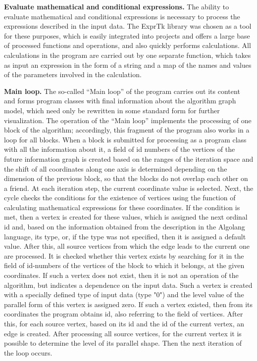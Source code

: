 \textbf{Evaluate mathematical and conditional expressions.} The ability to evaluate mathematical and conditional expressions is necessary to process the expressions described in the input data. The ExprTk library was chosen as a tool for these purposes, which is easily integrated into projects and offers a large base of processed functions and operations, and also quickly performs calculations. All calculations in the program are carried out by one separate function, which takes as input an expression in the form of a string and a map of the names and values of the parameters involved in the calculation.

\textbf{Main loop.} The so-called “Main loop” of the program carries out its content and forms program classes with final information about the algorithm graph model, which need only be rewritten in some standard form for further visualization. The operation of the “Main loop” implements the processing of one block of the algorithm; accordingly, this fragment of the program also works in a loop for all blocks. When a block is submitted for processing as a program class with all the information about it, a field of id numbers of the vertices of the future information graph is created based on the ranges of the iteration space and the shift of all coordinates along one axis is determined depending on the dimension of the previous block, so that the blocks do not overlap each other on a friend. At each iteration step, the current coordinate value is selected. Next, the cycle checks the conditions for the existence of vertices using the function of calculating mathematical expressions for these coordinates. If the condition is met, then a vertex is created for these values, which is assigned the next ordinal id and, based on the information obtained from the description in the Algolang language, its type, or, if the type was not specified, then it is assigned a default value. After this, all source vertices from which the edge leads to the current one are processed. It is checked whether this vertex exists by searching for it in the field of id-numbers of the vertices of the block to which it belongs, at the given coordinates. If such a vertex does not exist, then it is not an operation of the algorithm, but indicates a dependence on the input data. Such a vertex is created with a specially defined type of input data (type "0") and the level value of the parallel form of this vertex is assigned zero. If such a vertex existed, then from its coordinates the program obtains id, also referring to the field of vertices. After this, for each source vertex, based on its id and the id of the current vertex, an edge is created. After processing all source vertices, for the current vertex it is possible to determine the level of its parallel shape. Then the next iteration of the loop occurs.

